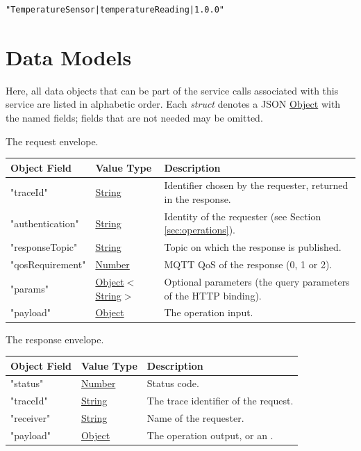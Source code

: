 \documentclass[a4paper]{arrowhead}
\newcommand{\mref}[2][]{{\textcolor{ArrowheadPurple}{\hyperref[sec:model:#2]{\ifstrempty{#1}{#2}{#1}}}}}
\newcommand{\oref}[1]{{\textcolor{ArrowheadBlue}{\hyperref[sec:operations:#1]{#1}}}}
\newcommand{\pref}[1]{{\textcolor{ArrowheadGrey}{\hyperref[sec:model:primitives:#1]{#1}}}}
\begin{document}
\begin{lstlisting}[caption={Payload of an \oref{revoke} request.}]
"TemperatureSensor|temperatureReading|1.0.0"
\end{lstlisting}

\newpage

\section{Data Models}
\label{sec:model}

Here, all data objects that can be part of the service calls associated with this service are listed in alphabetic order.
Each \textit{struct} denotes a JSON \pref{Object} with the named fields; fields that are not needed may be omitted.


The request envelope.

\noindent\begin{tabularx}{\textwidth}{| p{4.25cm} | p{3.5cm} | X |} \hline
\rowcolor{gray!33} Object Field & Value Type & Description \\ \hline
"traceId" & \pref{String} & Identifier chosen by the requester, returned in the response. \\ \hline
"authentication" & \pref{String} & Identity of the requester (see Section \ref{sec:operations}). \\ \hline
"responseTopic" & \pref{String} & Topic on which the response is published. \\ \hline
"qosRequirement" & \pref{Number} & MQTT QoS of the response (0, 1 or 2). \\ \hline
"params" & \pref{Object}$<$\pref{String}$>$ & Optional parameters (the query parameters of the HTTP binding). \\ \hline
"payload" & \pref{Object} & The operation input. \\ \hline
\end{tabularx}


The response envelope.

\noindent\begin{tabularx}{\textwidth}{| p{4.25cm} | p{3.5cm} | X |} \hline
\rowcolor{gray!33} Object Field & Value Type & Description \\ \hline
"status" & \pref{Number} & Status code. \\ \hline
"traceId" & \pref{String} & The trace identifier of the request. \\ \hline
"receiver" & \pref{String} & Name of the requester. \\ \hline
"payload" & \pref{Object} & The operation output, or an \mref{ErrorMessage}. \\ \hline
\end{tabularx}
\end{document}
